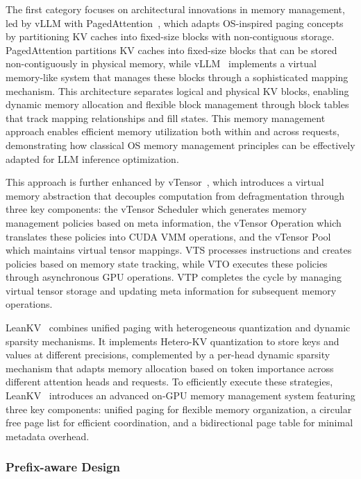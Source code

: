 The first category focuses on architectural innovations in memory management, led by vLLM with PagedAttention~\cite{DBLP:conf/sosp/KwonLZ0ZY0ZS23}, which adapts OS-inspired paging concepts by partitioning KV caches into fixed-size blocks with non-contiguous storage. PagedAttention partitions KV caches into fixed-size blocks that can be stored non-contiguously in physical memory, while vLLM~\cite{DBLP:conf/sosp/KwonLZ0ZY0ZS23} implements a virtual memory-like system that manages these blocks through a sophisticated mapping mechanism. This architecture separates logical and physical KV blocks, enabling dynamic memory allocation and flexible block management through block tables that track mapping relationships and fill states. This memory management approach enables efficient memory utilization both within and across requests, demonstrating how classical OS memory management principles can be effectively adapted for LLM inference optimization.

This approach is further enhanced by vTensor~\cite{xu2024vtensorflexiblevirtualtensor}, which introduces a virtual memory abstraction that decouples computation from defragmentation through three key components: the vTensor Scheduler which generates memory management policies based on meta information, the vTensor Operation which translates these policies into CUDA VMM operations, and the vTensor Pool which maintains virtual tensor mappings. VTS processes instructions and creates policies based on memory state tracking, while VTO executes these policies through asynchronous GPU operations. VTP completes the cycle by managing virtual tensor storage and updating meta information for subsequent memory operations.

LeanKV~\cite{zhang2024unifyingkvcachecompression} combines unified paging with heterogeneous quantization and dynamic sparsity mechanisms. It implements Hetero-KV quantization to store keys and values at different precisions, complemented by a per-head dynamic sparsity mechanism that adapts memory allocation based on token importance across different attention heads and requests. To efficiently execute these strategies, LeanKV~\cite{zhang2024unifyingkvcachecompression} introduces an advanced on-GPU memory management system featuring three key components: unified paging for flexible memory organization, a circular free page list for efficient coordination, and a bidirectional page table for minimal metadata overhead. 

\subsubsection{Prefix-aware Design}\label{sec:sys_mm_pd} 


